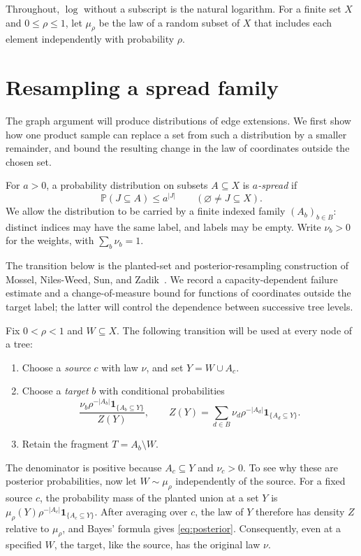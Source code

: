 \documentclass[11pt]{article}
\numberwithin{equation}{section}
\newcommand{\PP}{\mathbb P}
\newcommand{\ind}{\mathbf 1}
\begin{document}
Throughout, $\log$ without a subscript is the natural logarithm.
For a finite set $X$ and $0\le\rho\le1$, let $\mu_\rho$ be the law
of a random subset of $X$ that includes each element independently
with probability $\rho$.

\section{Resampling a spread family}\label{sec:resampling}

The graph argument will produce distributions of edge extensions. We first
show how one product sample can replace a set from such a distribution
by a smaller remainder, and bound the resulting change in the law of
coordinates outside the chosen set.

For $a>0$, a probability distribution on subsets $A\subseteq X$ is
\emph{$a$-spread} if
\begin{equation}\label{eq:spread}
 \PP(J\subseteq A)\le a^{|J|}
 \qquad(\varnothing\ne J\subseteq X).
\end{equation}
We allow the distribution to be carried by a finite indexed family
$(A_b)_{b\in B}$: distinct indices may have the same label, and labels
may be empty. Write $\nu_b>0$ for the weights, with $\sum_b\nu_b=1$.

The transition below is the planted-set and posterior-resampling
construction of Mossel, Niles-Weed, Sun, and Zadik~\cite[Sections~2.1--2.3]{MNSZ25}.
We record a capacity-dependent failure estimate and a change-of-measure
bound for functions of coordinates outside the target label; the latter
will control the dependence between successive tree levels.

Fix $0<\rho<1$ and $W\subseteq X$. The following transition will be
used at every node of a tree:
\begin{enumerate}[label=\arabic*.,leftmargin=2em,itemsep=2pt]
 \item Choose a \emph{source} $c$ with law $\nu$, and set $Y=W\cup A_c$.
 \item Choose a \emph{target} $b$ with conditional probabilities
 \begin{equation}\label{eq:posterior}
  \frac{\nu_b\rho^{-|A_b|}\ind_{\{A_b\subseteq Y\}}}{Z(Y)},
  \qquad
  Z(Y)=\sum_{d\in B}\nu_d\rho^{-|A_d|}
                  \ind_{\{A_d\subseteq Y\}}.
 \end{equation}
 \item Retain the fragment $T=A_b\setminus W$.
\end{enumerate}
The denominator is positive because $A_c\subseteq Y$ and $\nu_c>0$.
To see why these are posterior probabilities, now let $W\sim\mu_\rho$
independently of the source. For a fixed source $c$, the probability
mass of the planted union at a set $Y$ is
$\mu_\rho(Y)\rho^{-|A_c|}\ind_{\{A_c\subseteq Y\}}$.
After averaging over $c$, the law of $Y$ therefore has density $Z$
relative to $\mu_\rho$, and Bayes' formula gives
\eqref{eq:posterior}. Consequently, even at a specified $W$, the target, like the source,
has the original law $\nu$.
\end{document}
